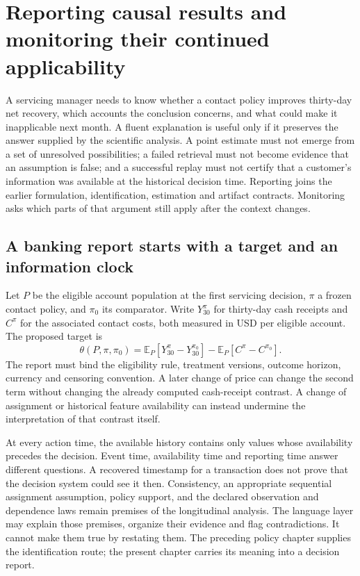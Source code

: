 \chapter{Reporting causal results and monitoring their continued applicability}
\label{exec16:reporting}

A servicing manager needs to know whether a contact policy improves thirty-day
net recovery, which accounts the conclusion concerns, and what could make it
inapplicable next month. A fluent explanation is useful only if it preserves the
answer supplied by the scientific analysis. A point estimate must not emerge
from a set of unresolved possibilities; a failed retrieval must not become
evidence that an assumption is false; and a successful replay must not certify
that a customer's information was available at the historical decision time.
Reporting joins the earlier formulation, identification, estimation and artifact
contracts. Monitoring asks which parts of that argument still apply after the
context changes.

\section{A banking report starts with a target and an information clock}

Let \(P\) be the eligible account population at the first servicing decision,
\(\pi\) a frozen contact policy, and \(\pi_0\) its comparator. Write
\(Y_{30}^{\pi}\) for thirty-day cash receipts and \(C^\pi\) for the associated
contact costs, both measured in USD per eligible account. The proposed target is
\[
 \theta(P,\pi,\pi_0)
   =\mathbb E_P[Y_{30}^{\pi}-Y_{30}^{\pi_0}]
     -\mathbb E_P[C^\pi-C^{\pi_0}].
\]
The report must bind the eligibility rule, treatment versions, outcome horizon,
currency and censoring convention. A later change of price can change the second
term without changing the already computed cash-receipt contrast. A change of
assignment or historical feature availability can instead undermine the
interpretation of that contrast itself.

At every action time, the available history contains only values whose
availability precedes the decision. Event time, availability time and reporting
time answer different questions. A recovered timestamp for a transaction does
not prove that the decision system could see it then. Consistency, an
appropriate sequential assignment assumption, policy support, and the declared
observation and dependence laws remain premises of the longitudinal analysis.
The language layer may explain those premises, organize their evidence and flag
contradictions. It cannot make them true by restating them. The preceding policy
chapter supplies the identification route; the present chapter carries its
meaning into a decision report.

